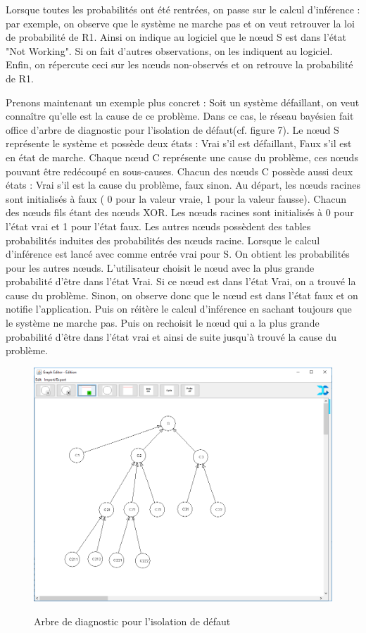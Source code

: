\documentclass[conference]{IEEEtran}
\begin{document}
Lorsque toutes les probabilités ont été rentrées, on passe sur le calcul d'inférence : par exemple, on observe que le système ne marche pas et on veut retrouver la loi de probabilité de R1. Ainsi on indique au logiciel que le nœud S est dans l'état "Not Working". Si on fait d'autres observations, on les indiquent au logiciel. Enfin, on répercute ceci sur les nœuds non-observés et on retrouve la probabilité de R1.

Prenons maintenant un exemple plus concret : Soit un système défaillant, on veut connaître qu'elle est la cause de ce problème. Dans ce cas, le réseau bayésien fait office d'arbre de diagnostic pour l'isolation de défaut(cf. figure 7). Le nœud S représente le système et possède deux états : Vrai s'il est défaillant, Faux s'il est en état de marche. Chaque nœud C représente une cause du problème, ces nœuds pouvant être  redécoupé en sous-causes. Chacun des nœuds C possède aussi deux états : Vrai s'il est la cause du problème, faux sinon. Au départ, les nœuds racines sont initialisés à faux ( 0 pour la valeur vraie, 1 pour la valeur fausse). Chacun des nœuds fils étant des nœuds XOR. Les nœuds racines sont initialisés à 0 pour l'état vrai et 1 pour l'état faux. Les autres nœuds possèdent des tables probabilités induites des probabilités des nœuds racine. Lorsque le calcul d'inférence est lancé avec comme entrée vrai pour S. On obtient les probabilités pour les autres nœuds. L'utilisateur choisit le nœud avec la plus grande probabilité d'être dans l'état Vrai. Si ce nœud est dans l'état Vrai, on a trouvé la cause du problème. Sinon, on observe donc que le nœud est dans l'état faux et on notifie l'application. Puis on réitère le calcul d'inférence en sachant toujours que le système ne marche pas. Puis on rechoisit le nœud qui a la plus grande probabilité d'être dans l'état vrai et ainsi de suite jusqu'à trouvé la cause du problème.


\begin{figure}[!h]
\begin{center}
\includegraphics[scale=0.35]{Arbre_de_diagnostic.png}
\label{fig 6}
\caption{Arbre de diagnostic pour l'isolation de défaut}
\end{center}
\end{figure}
\end{document}
